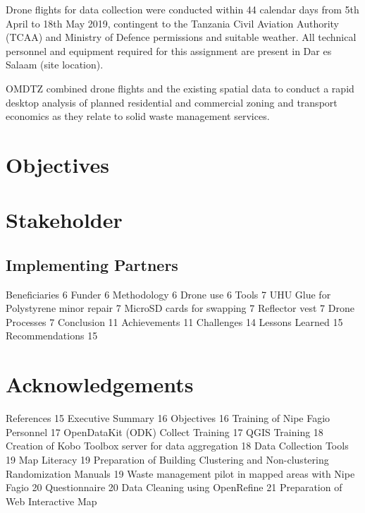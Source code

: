 \documentclass[a4paper,12pt,twoside]{article}
\begin{document}
Drone flights for data collection were conducted within 44 calendar days from 5th April to 18th May 2019, contingent  to the Tanzania Civil Aviation Authority (TCAA) and Ministry of Defence permissions and suitable weather. All technical personnel and equipment required for this assignment are present in Dar es Salaam (site location). 

OMDTZ  combined drone flights and the existing spatial data to conduct a rapid desktop analysis of planned residential and commercial zoning and transport economics as they relate to solid waste management services.

\section{Objectives}

\begin{multicols}{2}
\lipsum[0-5]
\end{multicols}

\section{Stakeholder}

\begin{multicols}{2}
\lipsum[0-5]
\end{multicols}

\subsection{Implementing Partners}
\lipsum[0-5]

Beneficiaries	6
Funder	6
Methodology	6
Drone use	6
Tools	7
UHU Glue for Polystyrene minor repair	7
MicroSD cards for swapping	7
Reflector vest	7
Drone Processes	7
Conclusion	11
Achievements	11
Challenges	14
Lessons Learned	15
Recommendations	15

\section{Acknowledgements}

\begin{multicols}{2}
\lipsum[0-5]
\end{multicols}


References	15
Executive Summary	16
Objectives	16
Training of Nipe Fagio Personnel	17
OpenDataKit (ODK) Collect Training	17
QGIS Training	18
Creation of Kobo Toolbox  server for data aggregation	18
Data Collection Tools	19
Map Literacy	19
Preparation of Building Clustering and Non-clustering Randomization Manuals	19
Waste management pilot in mapped areas with Nipe Fagio	20
Questionnaire	20
Data Cleaning using OpenRefine	21
Preparation of Web Interactive Map
\end{document}
